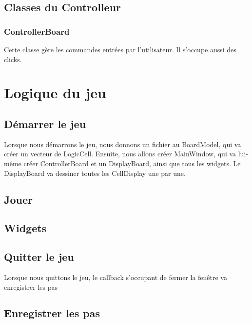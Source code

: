 \documentclass[utf8]{article}
\begin{document}
\begin{large}
\subsection{Classes du Controlleur}
\subsubsection{ControllerBoard}
\par
\indent
Cette classe gère les commandes entrées par l'utilisateur. Il s'occupe aussi des
clicks.
\par

\par
\section{Logique du jeu}
\par
\indent
\subsection{Démarrer le jeu}
\par
\indent
Lorsque nous démarrons le jeu, nous donnons un fichier au BoardModel, qui va
créer un vecteur de LogicCell. Ensuite, nous allons créer MainWindow, qui va
lui-même créer ControllerBoard et un DisplayBoard, ainsi que tous les widgets.
Le DisplayBoard va dessiner toutes les CellDisplay une par une.


\par
\subsection{Jouer}
\par
\indent
\par

\subsection{Widgets}
\par
\indent
\par
\subsection{Quitter le jeu}
\par
\indent
Lorsque nous quittons le jeu, le callback s'occupant de fermer la fenêtre va enregistrer les pas
\par
\subsection{Enregistrer les pas}
\par
\indent
\par


\end{large}
\end{document}
